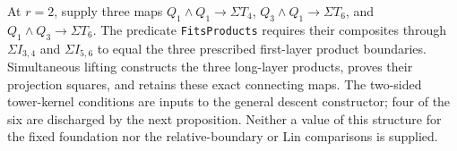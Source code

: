 \begin{definition}
  \label{def:h6-three-boundary-lifts}
  \leanok
  At $r=2$, supply three maps
  $Q_1\wedge Q_1\to\Sigma T_4$,
  $Q_3\wedge Q_1\to\Sigma T_6$, and
  $Q_1\wedge Q_3\to\Sigma T_6$. The predicate
  \texttt{FitsProducts} requires their composites through
  $\Sigma I_{3,4}$ and $\Sigma I_{5,6}$ to equal the three prescribed
  first-layer product boundaries. Simultaneous lifting constructs the
  three long-layer products, proves their projection squares, and retains
  these exact connecting maps. The two-sided tower-kernel conditions
  are inputs to the general descent constructor; four of the six are
  discharged by the next proposition. Neither a value of this structure for the
  fixed foundation nor the relative-boundary or Lin comparisons is supplied.
\end{definition}

